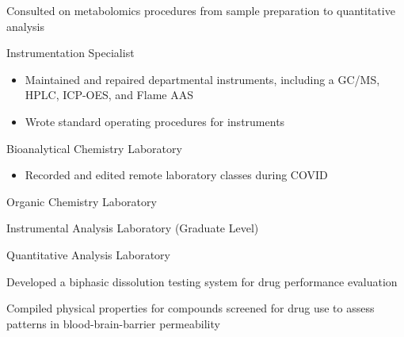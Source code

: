 \documentclass[]{deedy-resume-openfont}
\begin{document}
\begin{minipage}[t]{0.7\textwidth}
\begin{tightemize}
\item Consulted on metabolomics procedures from sample preparation to
quantitative analysis
\end{tightemize}

\begin{tightemize}
\item Instrumentation Specialist
    \begin{itemize}
    \item Maintained and repaired departmental instruments, including a GC/MS,
    HPLC, ICP-OES, and Flame AAS
    \item Wrote standard operating procedures for instruments
    \end{itemize}
\item Bioanalytical Chemistry Laboratory
    \begin{itemize}
    \item Recorded and edited remote laboratory classes during COVID
    \end{itemize}
\item Organic Chemistry Laboratory
\item Instrumental Analysis Laboratory (Graduate Level)
\item Quantitative Analysis Laboratory
\end{tightemize}
\sectionsep

\begin{tightemize}
\item Developed a biphasic dissolution testing system for drug performance
evaluation
\end{tightemize}
\sectionsep

\begin{tightemize}
\item Compiled physical properties for compounds screened for drug use to assess
patterns in blood-brain-barrier permeability
\end{tightemize}
\sectionsep

\end{minipage}
\hfill
\end{document}
